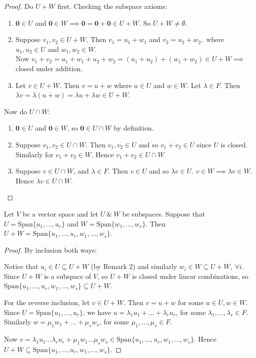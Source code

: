 \documentclass[10pt]{scrartcl}
\begin{document}
\begin{proof}
Do $U+W$ first. Checking the subspace axioms:
\begin{enumerate}
\item  $\mathbf{0} \in U$ and $\mathbf{0} \in W \implies \mathbf{0} = \mathbf{0} + \mathbf{0} \in U + W$. So $U + W \neq \emptyset$. 
\item Suppose $v_1, v_2 \in U + W$. Then $v_1 = u_1 + w_1$ and $v_2 = u_2 + w_2,$ where $u_1,u_2 \in U$ and $w_1, w_2 \in W$.\\

Now $v_1 + v_2 = u_1 + w_1 + u_2 + w_2 = (u_1 + u_2) + (w_1 + w_2) \in U + W \implies$ closed under addition.

\item Let $v \in U + W$. Then $v = u + w$ where $u \in U$ and $w \in W.$ Let $\lambda \in F$. Then $\lambda v = \lambda(u+w) = \lambda u + \lambda w \in U + W$.
\end{enumerate}

Now do $U \cap W$:
\begin{enumerate}
\item $\mathbf{0} \in U$ and $\mathbf{0} \in W$, so $\mathbf{0} \in U \cap W$ by definition.
\item Suppose $v_1, v_2 \in U \cap W.$ Then $v_1, v_2 \in U$ and so $v_1 + v_2 \in U$ since $U$ is closed. Similarly for $v_1 + v_2 \in W$. Hence $v_1 + v_2 \in U \cap W$. 
\item Suppose $v \in U \cap W$, and $\lambda \in F.$ Then $v \in U$ and so $\lambda v \in U$. $v \in W \implies \lambda v \in W.$ Hence $\lambda v \in U \cap W$.\qedhere 
\end{enumerate}
\end{proof}\vspace*{10pt}

\begin{proposition}Let {\normalfont{}}
 $V$ be a vector space and let $U ~\&~ W$ be subspaces. Suppose that $U = \text{Span}\{u_1,\dots,u_r\}$ and $W = \text{Span}\{w_1,\dots,w_s\}$. Then $U + W = \text{Span}\{u_1,\dots,u_r,w_1,\dots,w_s\}$. 
\end{proposition}
\begin{proof}
By inclusion both ways:

Notice that $u_i \in U \subseteq U + W$ (by Remark 2) and similarly $w_i \in W \subseteq U + W, ~\forall i$. Since $U + W$ is a subspace of $V$, so $U + W$ is closed under linear combinations, so $\text{Span}\{u_1,\dots,u_r,w_1,\dots,w_s\} \subseteq U + W.$

For the reverse inclusion, let $v \in U + W$. Then $v = u + w$ for some $u \in U, w \in W$. Since $U = \text{Span}\{u_1,\dots,u_r\}$, we have $u = \lambda_1u_1 + \dots + \lambda_ru_r$, for some $\lambda_1,\dots,\lambda_r \in F$. Similarly $w = \mu_1w_1 + \dots + \mu_sw_s$, for some $\mu_1,\dots,\mu_s \in F$.

Now $v = \lambda_1u_1 \dots \lambda_ru_r + \mu_1w_1 \dots \mu_sw_s \in \text{Span}\{u_1,\dots,u_r,w_1,\dots,w_s\}$. Hence $U + W \subseteq \text{Span}\{u_1,\dots,u_r,w_1,\dots,w_s\}$.
\end{proof}\vspace*{5pt}
\end{document}
